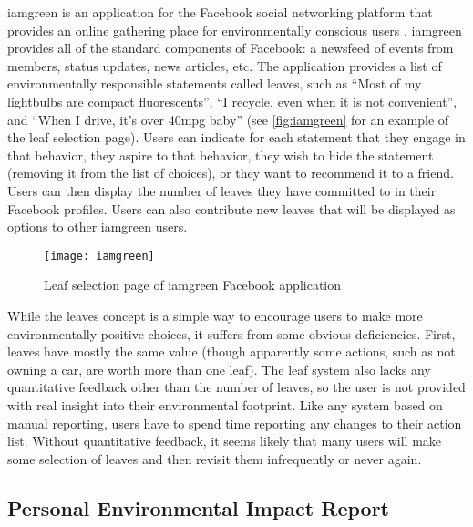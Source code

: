 iamgreen is an application for the Facebook social networking platform that provides an online gathering place for environmentally conscious users \cite{iamgreen-website}. iamgreen provides all of the standard components of Facebook: a newsfeed of events from members, status updates, news articles, etc. The application provides a list of environmentally responsible statements called leaves, such as ``Most of my lightbulbs are compact fluorescents'', ``I recycle, even when it is not convenient'', and ``When I drive, it's over 40mpg baby'' (see \autoref{fig:iamgreen} for an example of the leaf selection page). Users can indicate for each statement that they engage in that behavior, they aspire to that behavior, they wish to hide the statement (removing it from the list of choices), or they want to recommend it to a friend. Users can then display the number of leaves they have committed to in their Facebook profiles. Users can also contribute new leaves that will be displayed as options to other iamgreen users.

\begin{figure}[htbp]
	\begin{center}
		\texttt{[image: iamgreen]}
		\caption{Leaf selection page of iamgreen Facebook application}
		\label{fig:iamgreen}
 	\end{center}
\end{figure}

While the leaves concept is a simple way to encourage users to make more environmentally positive choices, it suffers from some obvious deficiencies. First, leaves have mostly the same value (though apparently some actions, such as not owning a car, are worth more than one leaf). The leaf system also lacks any quantitative feedback other than the number of leaves, so the user is not provided with real insight into their environmental footprint. Like any system based on manual reporting, users have to spend time reporting any changes to their action list. Without quantitative feedback, it seems likely that many users will make some selection of leaves and then revisit them infrequently or never again.

\subsection{Personal Environmental Impact Report}

